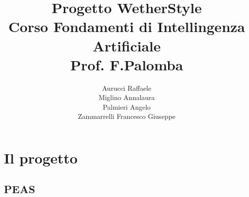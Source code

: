 \documentclass[a4paper, 10pt, oneside]{book}
\title{Progetto WetherStyle\\Corso Fondamenti di Intellingenza Artificiale\\Prof. F.Palomba }
\author{Aurucci Raffaele\\Miglino Annalaura\\Palmieri Angelo\\Zammarrelli Francesco Giuseppe}
\begin{document}
    \begin{titlepage}
        \maketitle
    \end{titlepage}
    \tableofcontents
    \chapter{Il progetto}
    \section{PEAS}
\end{document}
